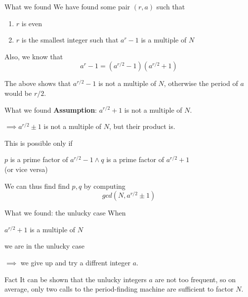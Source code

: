 \documentclass{beamer}
\begin{document}
    \begin{frame}{What we found}
        We have found some pair $(r,a)$ such that
        \begin{enumerate}
            \item $r$ is even
            \item $r$ is the smallest integer such that $a^r - 1$ is a multiple of $N$
        \end{enumerate}
        \vspace{0.75cm}
        Also, we know that
        $$a^r-1 = (a^{r/2} - 1)(a^{r/2} + 1)$$

        \vspace{0.5cm}
        The above shows that $a^{r/2} - 1$ is not a multiple of $N$, otherwise the period
        of $a$ would be $r/2$.
    \end{frame}
    \begin{frame}{What we found}
        \textbf{Assumption}: $a^{r/2} + 1$ is not a multiple of $N$. 
        \begin{center}
           $\implies a^{r/2} \pm 1$ is not a multiple of $N$, but their product is. 
        \end{center}
        
        \vspace{0.5cm}

        This is possible only if

        \begin{center}
          $p$ is a prime factor of $a^{r/2} - 1 \wedge q$ is a prime factor of $a^{r/2} + 1$ \\ 
        (or vice versa)  
        \end{center}

        \vspace{0.75cm} 
        We can thus find find $p,q$ by computing
        $$ gcd(N, a^{r/2} \pm 1)$$
    \end{frame}

    \begin{frame}{What we found: the unlucky case}
        When 
        \begin{center}
            $a^{r/2} + 1$ is a multiple of $N$
        \end{center}
        we are in the unlucky case
        \begin{center}
          $\implies$ we give up and try a diffrent integer $a$.  
        \end{center}
        
        \vspace{0.75cm}
        \begin{alertblock}{Fact}
            It can be shown that the unlucky integers $a$ are not too
            frequent, so on average, only two calls to the period-finding machine are sufficient to factor $N$.
        \end{alertblock}
    \end{frame}
\end{document}

